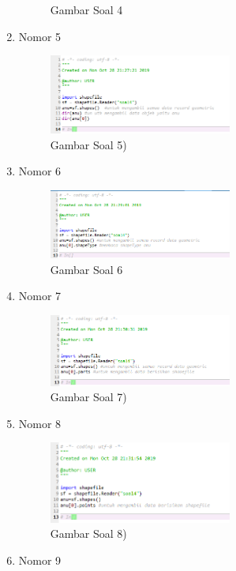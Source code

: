 \begin{enumerate}
\begin{figure}[H]
  \centering
  \caption{Gambar Soal 4}
 \end{figure}
 \item Nomor 5
 
 \begin{figure}[H]
  \includegraphics[width=6cm]{figures/Tugas3/1174062/Soal5.png}
  \centering
  \caption{Gambar Soal 5)}
 \end{figure}
 \item Nomor 6
 
 \begin{figure}[H]
  \includegraphics[width=6cm]{figures/Tugas3/1174062/Soal6.png}
  \centering
  \caption{Gambar Soal 6}
 \end{figure}
 \item Nomor 7
 
 \begin{figure}[H]
  \includegraphics[width=6cm]{figures/Tugas3/1174062/Soal7.png}
  \centering
  \caption{Gambar Soal 7)}
 \end{figure}
 \item Nomor 8
 
 \begin{figure}[H]
  \includegraphics[width=6cm]{figures/Tugas3/1174062/Soal8.png}
  \centering
  \caption{Gambar Soal 8)}
 \end{figure}
 \item Nomor 9
 

\end{enumerate}
